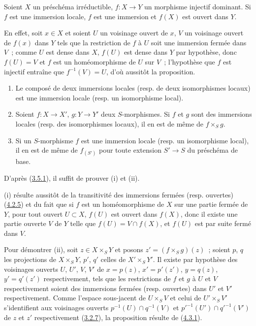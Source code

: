 \begin{proposition}[4.5.4]
\label{I.4.5.4-fr}
Soient $X$ un préschéma irréductible, $f:X\to Y$ un morphisme injectif
dominant. Si $f$ est une immersion locale, $f$ est une immersion et $f(X)$
est ouvert dans $Y$.
\end{proposition}

En effet, soit $x\in X$ et soient $U$ un voisinage ouvert de $x$, $V$ un
voisinage ouvert de $f(x)$ dans $Y$ tels que la restriction de $f$ à $U$
soit une immersion fermée dans $V$~; comme $U$ est dense dans $X$, $f(U)$
est dense dans $Y$ par hypothèse, donc $f(U)=V$ et $f$ est un homéomorphisme
de $U$ sur $V$~; l'hypothèse que $f$ est injectif entraîne que
$f^{-1}(V)=U$, d'où aussitôt la proposition.

\begin{proposition}[4.5.5]
\label{I.4.5.5-fr}
\begin{enumerate}
  \item[\rm(i)] Le composé de deux immersions locales (\textup{resp.} de deux
    isomorphismes locaux) est une immersion locale (\textup{resp.} un isomorphisme
    local).
  \item[\rm(ii)] Soient $f:X\to X'$, $g:Y\to Y'$ deux $S$-morphismes. Si
    $f$ et $g$ sont des immersions locales (\textup{resp.} des isomorphismes locaux),
    il en est de même de $f\times_S g$.
  \item[\rm(iii)] Si un $S$-morphisme $f$ est une immersion locale (\textup{resp.} un
    isomorphisme local), il en est de même de $f_{(S')}$ pour toute extension
    $S'\to S$ du préschéma de base.
\end{enumerate}
\end{proposition}

D'après (\hyperref[I.3.5.1-fr]{3.5.1}), il suffit de prouver (i) et (ii).

(i) résulte aussitôt de la transitivité des immersions fermées (resp.
ouvertes) (\hyperref[I.4.2.5-fr]{4.2.5}) et du fait que si $f$ est un
homéomorphisme de $X$ sur une partie fermée de $Y$, pour tout ouvert
$U\subset X$, $f(U)$ est ouvert dans $f(X)$, donc il existe une partie
ouverte $V$ de $Y$ telle que $f(U)=V\cap f(X)$, et $f(U)$ est par suite fermé
dans $V$.

Pour démontrer (ii), soit $z\in X\times_S Y$ et posons $z'=(f\times_S g)(z)$~; soient $p$, $q$ les projections de $X\times_S Y$, $p'$,
$q'$ celles de $X'\times_S Y'$. Il existe par hypothèse des voisinages
ouverts $U$, $U'$, $V$, $V'$ de $x=p(z)$, $x'=p'(z')$, $y=q(z)$,
$y'=q'(z')$ respectivement, tels que les restrictions de $f$ et $g$ à $U$
et $V$ respectivement soient des immersions fermées (resp. ouvertes) dans
$U'$ et $V'$ respectivement. Comme l'espace sous-jacent de $U\times_S V$ et
celui de $U'\times_S V'$ s'identifient aux voisinages ouverts
$p^{-1}(U)\cap q^{-1}(V)$ et ${p'}^{-1}(U')\cap{q'}^{-1}(V')$ de $z$ et
$z'$ respectivement (\hyperref[I.3.2.7-fr]{3.2.7}), la proposition résulte
de (\hyperref[I.4.3.1-fr]{4.3.1}).
